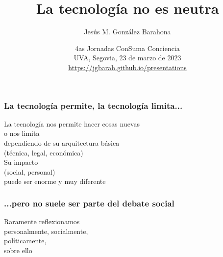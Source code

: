 \documentclass[17pt,aspectratio=169]{beamer}
\begin{document}
\title{La tecnología no es neutra}
\author{Jesús M. González Barahona}

\date{4as Jornadas ConSuma Conciencia \\
  UVA, Segovia, 23 de marzo de 2023\\
{\small \url{https://jgbarah.github.io/presentations}} \\}

\frame{
\maketitle
}





\begin{frame}
\frametitle{La tecnología permite, la tecnología limita...}

\begin{flushright}
La tecnología nos permite hacer cosas nuevas \\
o nos limita \\
dependiendo de su arquitectura básica \\
(técnica, legal, económica) \\
\vspace{.5cm}
Su impacto \\
(social, personal) \\
puede ser enorme y muy diferente \\
\end{flushright}

\end{frame}


\begin{frame}
\frametitle{...pero no suele ser parte del debate social}

\begin{center}
{\Large
Raramente reflexionamos\\
personalmente, socialmente, \\
políticamente, \\
sobre ello \\
}
\end{center}

\end{frame}
\end{document}
